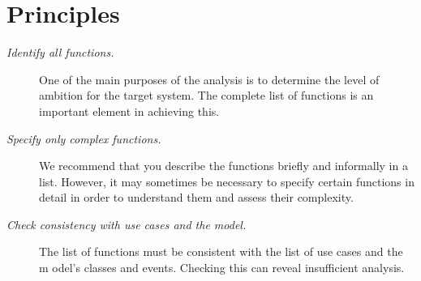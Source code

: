 \section{Principles}
\begin{description}
    \item[\textit{Identify all functions.}] One of the main purposes of the analysis is to determine the level of ambition for the target system. The complete list of functions is an important element in achieving this.
    \item[\textit{Specify only complex functions.}] We recommend that you describe the functions briefly and informally in a list. However, it may sometimes be necessary to specify certain functions in detail in order to understand them and assess their complexity.
    \item[\textit{Check consistency with use cases and the model.}] The list of functions must be consistent with the list of use cases and the m odel’s classes and events. Checking this can reveal insufficient analysis.
\end{description}